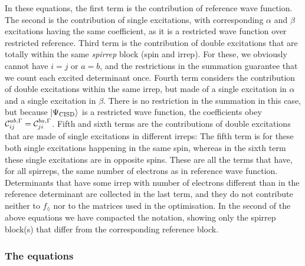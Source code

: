 In these equations, the first term is the contribution of reference wave function.
The second is the contribution of single excitations, with corresponding $\alpha$ and $\beta$ excitations having the same coefficient, as it is a restricted wave function over restricted reference.
Third term is the contribution of double excitations that are totally within the same \emph{spirrep} block (spin and irrep). For these, we obviously cannot have $i=j$ or $a=b$, and the restrictions in the summation guarantee that we count each excited determinant once.
Fourth term considers the contribution of double excitations within the same irrep, but made of a single excitation in $\alpha$ and a single excitation in $\beta$.
There is no restriction in the summation in this case, but because $\ket{\Psi_\text{CISD}}$ is a restricted wave function, the coefficients obey $\mathcal{C}_{ij}^{ab, \Gamma} =  \mathcal{C}_{ji}^{ba, \Gamma}$.
Fifth and sixth terms are the contributions of double excitations that are made of single excitations in different irreps:
The fifth term is for these both single excitations happening in the same spin, whereas in the sixth term these single excitations are in opposite spins.
These are all the terms that have, for all spirreps, the same number of electrons as in reference wave function.
Determinants that have some irrep with number of electrons different than in the reference determinant are collected in the last term, and they do not contribute neither to $f_\lozenge$ nor to the matrices used in the optimisation.
In the second of the above equations we have compacted the notation, showing only the spirrep block(s) that differ from the corresponding reference block. 

\subsubsection{The equations}

